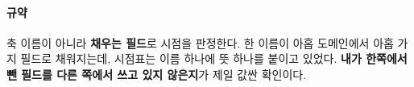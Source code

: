\documentclass[10pt]{article}
\begin{document}
\paragraph{규약} 축 이름이 아니라 \textbf{채우는 필드}로 시점을 판정한다.
한 이름이 아홉 도메인에서 아홉 가지 필드로 채워지는데, 시점표는 이름 하나에
뜻 하나를 붙이고 있었다. \textbf{내가 한쪽에서 뺀 필드를 다른 쪽에서 쓰고
있지 않은지}가 제일 값싼 확인이다.
\end{document}
